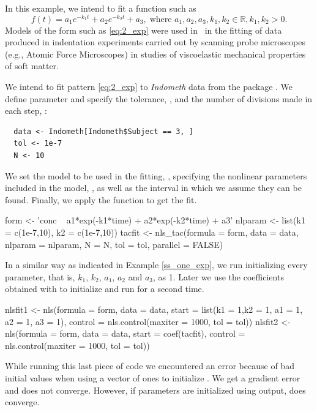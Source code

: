 In this example, we intend to fit a function such as
\begin{equation}\label{eq:2_exp}
f(t)=a_1 e^{-k_1t} + a_2 e^{-k_2t}  + a_3, \; \text{where } a_1,a_2,a_3,k_1,k_2 \in \mathbb{R}, k_1,k_2>0.
\end{equation}
Models of the form such as \eqref{eq:2_exp} were used in~\citet{beniteztoca2010} in the fitting of data produced in indentation experiments carried out by scanning probe microscopes (e.g., Atomic Force Microscopes) in studies of viscoelastic mechanical properties of soft matter.

We intend to fit pattern \eqref{eq:2_exp} to \textit{Indometh} data from the   package \citep{R}. We define parameter  and specify the tolerance, , and the number of divisions made in each step, :
\begin{verbatim}
  data <- Indometh[Indometh$Subject == 3, ]
  tol <- 1e-7
  N <- 10
\end{verbatim}

We set the model to be used in the fitting, , specifying the nonlinear parameters included in the model, , as well as the interval in which we assume they can be found. Finally, we apply the  function to get the fit. 
\begin{example}
  form <- 'conc ~ a1*exp(-k1*time) + a2*exp(-k2*time) + a3'
  nlparam <- list(k1 = c(1e-7,10), k2 = c(1e-7,10))
  tacfit <- nls_tac(formula = form, data = data,  nlparam = nlparam, N = N, tol = tol,
    parallel = FALSE)
\end{example}
In a similar way as indicated in Example \ref{ss_one_exp}, we run  initializing every parameter, that is, $k_1$, $k_2$, $a_1$, $a_2$ and $a_3$, as 1. Later we use the coefficients obtained with  to initialize and run  for a second time.
\begin{example}
  nlsfit1 <- nls(formula = form, data = data, 
    start = list(k1 = 1,k2 = 1, a1 = 1, a2 = 1, a3 = 1), 
    control = nls.control(maxiter = 1000, tol = tol))
  nlsfit2 <- nls(formula = form, data = data, start = coef(tacfit), 
    control = nls.control(maxiter = 1000, tol = tol))
\end{example}
While running this last piece of code we encountered an error because of bad initial values when using a vector of ones to initialize . We get a gradient error and  does not converge. However, if parameters are initialized using  output,  does converge. 

